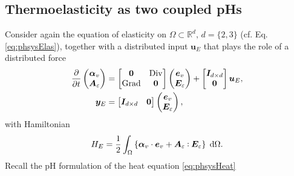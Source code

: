 \subsection{Thermoelasticity as two coupled pHs}

Consider again the equation of elasticity on $\Omega \subset \mathbb{R}^d, \, d =\{2, 3\}$ (cf. Eq. \eqref{eq:phsysElas}), together with a distributed input $\bm{u}_E$ that plays the role of a distributed force
\begin{equation}
\begin{aligned}
\diffp{}{t}
\begin{pmatrix}
\bm{\alpha}_v \\
\bm{A}_{\varepsilon} \\
\end{pmatrix} &= 
\begin{bmatrix}
\bm{0} & \Div \\
\Grad & \bm{0} \\
\end{bmatrix}
\begin{pmatrix}
\bm{e}_v \\
\bm{E}_{\varepsilon} \\
\end{pmatrix} + 
\begin{bmatrix}
\bm{I}_{d\times d} \\
\bm{0} \\
\end{bmatrix}\bm{u}_E, \\
\bm{y}_E &= \begin{bmatrix}
\bm{I}_{d\times d} & \bm{0} \\
\end{bmatrix}
\begin{pmatrix}
\bm{e}_v \\
\bm{E}_{\varepsilon}
\end{pmatrix},
\end{aligned}
\end{equation}
with Hamiltonian  
\[
H_E = \energy{\bm{\alpha}_v \cdot \bm{e}_v + \bm{A}_{\varepsilon} \cddot \bm{E}_{\varepsilon}}.
\]
Recall the pH formulation of the heat equation \eqref{eq:phsysHeat}
